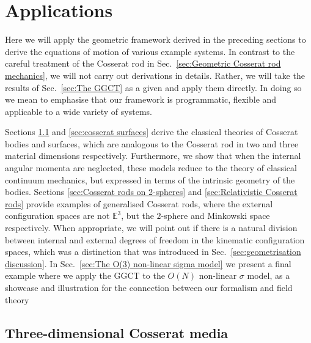 \section{Applications} \label{sec:geometrisation applications}

Here we will apply the geometric framework derived in the preceding sections to derive the equations of motion of various example systems. In contrast to the careful treatment of the Cosserat rod in Sec.~\ref{sec:Geometric Cosserat rod mechanics}, we will not carry out derivations in details. Rather, we will take the results of Sec.~\ref{sec:The GGCT} as a given and apply them directly. In doing so we mean to emphasise that our framework is programmatic, flexible and applicable to a wide variety of systems.

Sections \ref{sec:cosserat 3d bodies} and \ref{sec:cosserat surfaces} derive the classical theories of Cosserat bodies and surfaces, which are analogous to the Cosserat rod in two and three material dimensions respectively. Furthermore, we show that when the internal angular momenta are neglected, these models reduce to the theory of classical continuum mechanics, but expressed in terms of the intrinsic geometry of the bodies. Sections \ref{sec:Cosserat rods on 2-spheres} and \ref{sec:Relativistic Cosserat rods} provide examples of generalised Cosserat rods, where the external configuration spaces are not $\mathbb{E}^3$, but the $2$-sphere and Minkowski space respectively. When appropriate, we will point out if there is a natural division between internal and external degrees of freedom in the kinematic configuration spaces, which was a distinction that was introduced in Sec.~\ref{sec:geometrisation discussion}. In Sec.~\ref{sec:The O(3) non-linear sigma model} we present a final example where we apply the GGCT to the $O(N)$ non-linear $\sigma$ model, as a showcase and illustration for the connection between our formalism and field theory


\subsection{Three-dimensional Cosserat media}  \label{sec:cosserat 3d bodies}

